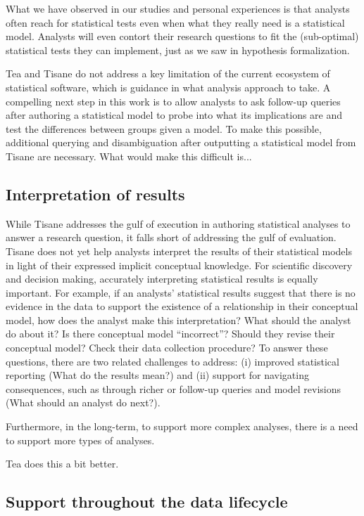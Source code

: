 What we have observed in our studies and personal experiences is that analysts
often reach for statistical tests even when what they really need is a
statistical model. Analysts will even contort their research questions to fit
the (sub-optimal) statistical tests they can implement, just as we saw in
hypothesis formalization. 

Tea and Tisane do not address a key limitation of the current ecosystem of
statistical software, which is guidance in what analysis approach to take. A
compelling next step in this work is to allow analysts to ask follow-up queries
after authoring a statistical model to probe into what its implications are and
test the differences between groups given a model. To make this possible,
additional querying and disambiguation after outputting a statistical model from
Tisane are necessary. What would make this difficult is...

\subsection{Interpretation of results}
While Tisane addresses the gulf of execution in authoring statistical analyses
to answer a research question, it falls short of addressing the gulf of
evaluation. Tisane does not yet help analysts interpret the results of their
statistical models in light of their expressed implicit conceptual knowledge.
For scientific discovery and decision making, accurately interpreting
statistical results is equally important. For example, if an analysts'
statistical results suggest that there is no evidence in the data to support the
existence of a relationship in their conceptual model, how does the analyst make
this interpretation? What should the analyst do about it? Is there conceptual
model ``incorrect''? Should they revise their conceptual model? Check their data
collection procedure? To answer these questions, there are two related
challenges to address: (i) improved statistical reporting (What do the results
mean?) and (ii) support for navigating consequences, such as through richer or
follow-up queries and model revisions (What should an analyst do next?). 

Furthermore, in the long-term, to support more complex analyses, there is a need
to support more types of analyses. 

Tea does this a bit better. 

\subsection{Support throughout the data lifecycle}

